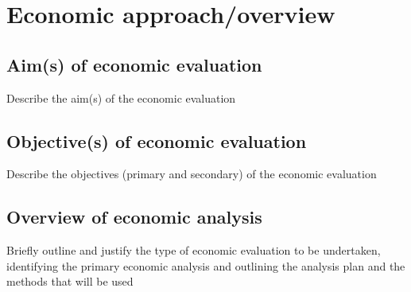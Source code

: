 
\section{Economic approach/overview}

\subsection{Aim(s) of economic evaluation}

Describe the aim(s) of the economic evaluation


\subsection{Objective(s) of economic evaluation}

Describe the objectives (primary and secondary) of the economic evaluation


\subsection{Overview of economic analysis}

Briefly outline and justify the type of economic evaluation to be
undertaken, identifying the primary economic analysis and outlining
the analysis plan and the methods that will be used


